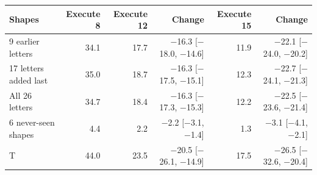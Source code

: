 \begin{tabular}{lrrrrr}
\toprule
Shapes & Execute 8 & Execute 12 & Change & Execute 15 & Change \\
\midrule
9 earlier letters & 34.1 & 17.7 & $-$16.3 [$-$18.0, $-$14.6] & 11.9 & $-$22.1 [$-$24.0, $-$20.2] \\
17 letters added last & 35.0 & 18.7 & $-$16.3 [$-$17.5, $-$15.1] & 12.3 & $-$22.7 [$-$24.1, $-$21.3] \\
All 26 letters & 34.7 & 18.4 & $-$16.3 [$-$17.3, $-$15.3] & 12.2 & $-$22.5 [$-$23.6, $-$21.4] \\
6 never-seen shapes & 4.4 & 2.2 & $-$2.2 [$-$3.1, $-$1.4] & 1.3 & $-$3.1 [$-$4.1, $-$2.1] \\
T & 44.0 & 23.5 & $-$20.5 [$-$26.1, $-$14.9] & 17.5 & $-$26.5 [$-$32.6, $-$20.4] \\
\bottomrule
\end{tabular}
